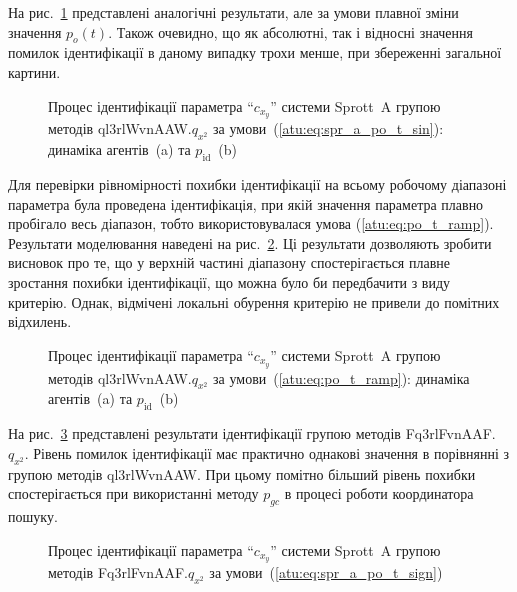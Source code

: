 На рис.~\ref{atu:f:spr_a_id_ql3rlWvnAAW_q_x2_sin} представлені аналогічні
результати, але за умови плавної зміни значення
$p_o(t)$. Також очевидно, що як абсолютні, так і відносні значення
помилок ідентифікації в даному випадку трохи менше, при
збереженні загальної картини.

\begin{figure}[htb!]
  \caption{Процес ідентифікації параметра ``$c_{x_y}$'' системи Sprott~A групою методів ql3rlWvnAAW.$q_{x^2}$ за умови~(\ref{atu:eq:spr_a_po_t_sin}): динаміка агентів~(a) та $p_\mathrm{id}$~(b)}
  \label{atu:f:spr_a_id_ql3rlWvnAAW_q_x2_sin}
\end{figure}

Для перевірки рівномірності похибки ідентифікації на всьому
робочому діапазоні параметра була проведена ідентифікація,
при якій значення параметра плавно пробігало весь діапазон,
тобто використовувалася умова (\ref{atu:eq:po_t_ramp}). Результати
моделювання наведені на рис.~\ref{atu:f:spr_a_id_ql3rlWvnAAW_q_x2_ramp}. Ці
результати дозволяють зробити висновок про те, що у верхній
частині діапазону спостерігається плавне зростання похибки
ідентифікації, що можна було би передбачити з виду критерію. Однак, відмічені
локальні обурення критерію не привели до помітних відхилень.


\begin{figure}[htb!]
  \caption{Процес ідентифікації параметра ``$c_{x_y}$'' системи Sprott~A групою методів ql3rlWvnAAW.$q_{x^2}$ за умови~(\ref{atu:eq:po_t_ramp}): динаміка агентів~(a) та $p_\mathrm{id}$~(b)}
  \label{atu:f:spr_a_id_ql3rlWvnAAW_q_x2_ramp}
\end{figure}

На рис.~\ref{atu:f:spr_a_id_Fq3rlFvnAAF_q_x2_sign} представлені результати
ідентифікації групою методів Fq3rlFvnAAF.$q_{x^2}$. Рівень помилок ідентифікації має практично однакові
значення в порівнянні з групою методів ql3rlWvnAAW. При цьому помітно
більший рівень похибки спостерігається при використанні методу
$p_{gc}$ в процесі роботи координатора пошуку.


\begin{figure}[htb!]
  \caption{Процес ідентифікації параметра ``$c_{x_y}$'' системи Sprott~A групою методів Fq3rlFvnAAF.$q_{x^2}$ за умови~(\ref{atu:eq:spr_a_po_t_sign})}
  \label{atu:f:spr_a_id_Fq3rlFvnAAF_q_x2_sign}
\end{figure}

